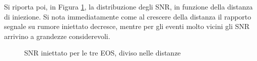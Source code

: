 Si riporta poi, in Figura \ref{fig:SNR_INJ_REC_COUNTS}, la distribuzione degli SNR, in funzione della distanza di iniezione. Si nota immediatamente come al crescere della distanza il rapporto segnale su rumore iniettato decresce, mentre per gli eventi molto vicini gli SNR arrivino a grandezze considerevoli. \\
\begin{figure}[hbt!]
	\vspace{-30pt}
	\centering
	\vspace{-8pt}
	\caption{SNR iniettato per le tre EOS, diviso nelle distanze}
	\label{fig:SNR_INJ_REC_COUNTS}
	\vspace{-15pt}
\end{figure}

